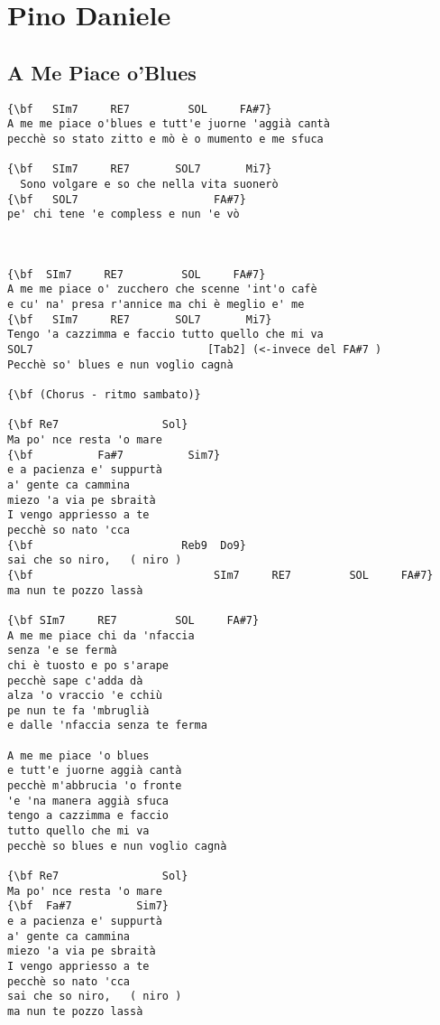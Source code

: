\documentclass[a4paper]{article}
\begin{document}
\section{Pino Daniele} %
\label{sec:Pino Daniele}
\subsection{A Me Piace o'Blues} %
\label{sub:A Me Piace o'Blues}
\begin{multicols}{2}
\begin{Verbatim}[commandchars=\\\{\}]
{\bf   SIm7     RE7         SOL     FA#7}
A me me piace o'blues e tutt'e juorne 'aggià cantà
pecchè so stato zitto e mò è o mumento e me sfuca

{\bf   SIm7     RE7       SOL7       Mi7}
  Sono volgare e so che nella vita suonerò
{\bf   SOL7      			    FA#7}
pe' chi tene 'e compless e nun 'e vò



{\bf  SIm7     RE7         SOL     FA#7}
A me me piace o' zucchero che scenne 'int'o cafè
e cu' na' presa r'annice ma chi è meglio e' me
{\bf   SIm7     RE7       SOL7       Mi7}
Tengo 'a cazzimma e faccio tutto quello che mi va
SOL7                           [Tab2] (<-invece del FA#7 )
Pecchè so' blues e nun voglio cagnà

{\bf (Chorus - ritmo sambato)}

{\bf Re7                Sol}
Ma po' nce resta 'o mare
{\bf          Fa#7          Sim7}
e a pacienza e' suppurtà
a' gente ca cammina
miezo 'a via pe sbraità
I vengo appriesso a te
pecchè so nato 'cca
{\bf                       Reb9  Do9}
sai che so niro,   ( niro )
{\bf                            SIm7     RE7         SOL     FA#7}
ma nun te pozzo lassà

{\bf SIm7     RE7         SOL     FA#7}
A me me piace chi da 'nfaccia
senza 'e se fermà
chi è tuosto e po s'arape
pecchè sape c'adda dà
alza 'o vraccio 'e cchiù
pe nun te fa 'mbruglià
e dalle 'nfaccia senza te ferma

A me me piace 'o blues
e tutt'e juorne aggià cantà
pecchè m'abbrucia 'o fronte
'e 'na manera aggià sfuca
tengo a cazzimma e faccio
tutto quello che mi va
pecchè so blues e nun voglio cagnà

{\bf Re7                Sol}
Ma po' nce resta 'o mare
{\bf  Fa#7          Sim7}
e a pacienza e' suppurtà
a' gente ca cammina
miezo 'a via pe sbraità
I vengo appriesso a te
pecchè so nato 'cca
sai che so niro,   ( niro )
ma nun te pozzo lassà
\end{Verbatim}
\end{multicols}
\newpage
\end{document}
